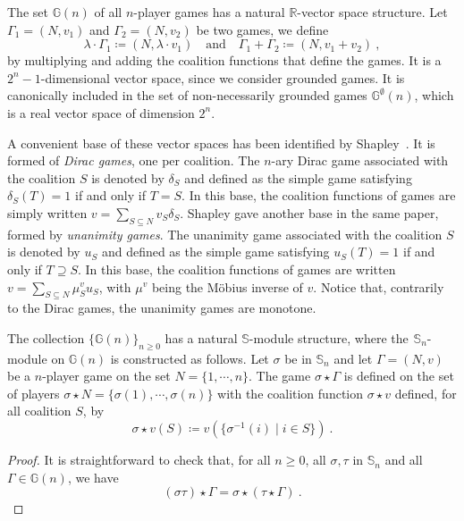 \documentclass[a4paper,12pt]{amsart}
\begin{document}
\medskip

The set $\mathbb{G}(n)$ of all $n$-player games has a natural $\mathbb{R}$-vector space structure. Let $\Gamma_1 =(N,v_1)$ and $\Gamma_2 = (N,v_2)$ be two games, we define 
\[
\lambda \cdot \Gamma_1 \coloneqq (N, \lambda \cdot v_1) \quad \text{and} \quad \Gamma_1 + \Gamma_2 \coloneqq (N, v_1 + v_2)~,
\]
by multiplying and adding the coalition functions that define the games. It is a $2^n-1$-dimensional vector space, since we consider grounded games. It is canonically included in the set of non-necessarily grounded games $\mathbb{G}^\emptyset(n)$, which is a real vector space of dimension $2^n$. 

\medskip

A convenient base of these vector spaces has been identified by Shapley~\cite{Shapley1953}. It is formed of \emph{Dirac games}, one per coalition. The \(n\)-ary Dirac game associated with the coalition \(S\) is denoted by \(\delta_S\) and defined as the simple game satisfying \(\delta_S(T) = 1\) if and only if \(T = S\). In this base, the coalition functions of games are simply written \(v = \sum_{S \subseteq N} v_S \delta_S\). Shapley gave another base in the same paper, formed by \emph{unanimity games}. The unanimity game associated with the coalition \(S\) is denoted by \(u_S\) and defined as the simple game satisfying \(u_S(T) = 1\) if and only if \(T \supseteq S\). In this base, the coalition functions of games are written \(v = \sum_{S \subseteq N} \mu^v_S u_S\), with \(\mu^v\) being the M{\"o}bius inverse of \(v\). Notice that, contrarily to the Dirac games, the unanimity games are monotone. 

\begin{lemma}
The collection $\{\mathbb{G}(n)\}_{n \geq 0}$ has a natural $\mathbb{S}$-module structure, where the $\hspace{1pt}\mathbb{S}_n$-module on $\mathbb{G}(n)$ is constructed as follows. Let $\sigma$ be in $\mathbb{S}_n$ and let $\Gamma = (N,v)$ be a $n$-player game on the set $N = \{1,\cdots,n\}$. The game $\sigma \star \Gamma$ is defined on the set of players $\sigma \star N = \{\sigma(1),\cdots,\sigma(n)\}$ with the coalition function \( \sigma \star v \) defined, for all coalition \(S\), by
\[
\sigma \star v(S) \coloneqq v(\{\sigma^{-1}(i) \mid i \in S\} )~.
\]
\end{lemma}

\begin{proof}
It is straightforward to check that, for all $n \geq 0$, all $\sigma, \tau$ in $\mathbb{S}_n$ and all $\Gamma \in \mathbb{G}(n)$, we have 
\[
(\sigma \tau) \star \Gamma = \sigma \star (\tau \star \Gamma)~.
\]
\end{proof}
\end{document}
